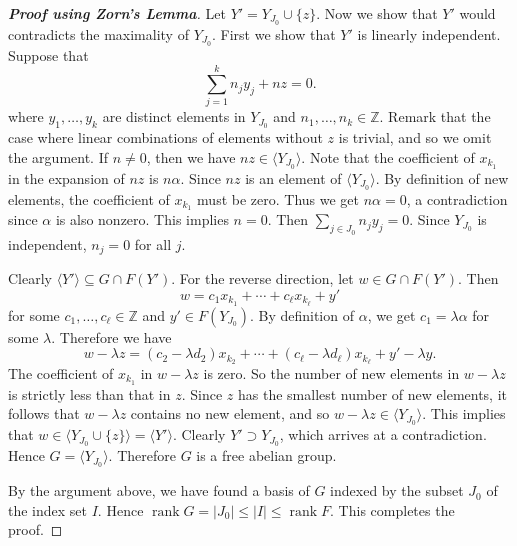 \begin{proof}[\textbf{Proof using Zorn's Lemma}]
	Let $Y' = Y_{J_0} \cup \{z\}$. Now we show that $Y'$ would contradicts the maximality of $Y_{J_0}$.  First we show that $Y'$ is linearly independent. Suppose that
	\begin{equation*}
		\sum_{j=1}^k n_j y_j + nz = 0.
	\end{equation*}
	where $y_1,\dots, y_k$ are distinct elements in $Y_{J_0}$ and $n_1,\dots, n_k\in \mathbb{Z}$. Remark that the case where linear combinations of elements without $z$ is trivial, and so we omit the argument. If $n\neq 0$, then we have $nz  \in \langle Y_{J_0} \rangle$. Note that the coefficient of $x_{k_1}$ in the expansion of $nz$ is $n\alpha$. Since $nz$ is an element of $\langle Y_{J_0} \rangle$. By definition of new elements, the coefficient of $x_{k_1}$ must be zero. Thus we get $n\alpha = 0$, a contradiction since $\alpha$ is also nonzero. This implies $n = 0$. Then $\sum_{j\in J_0} n_j y_j = 0$. Since $Y_{J_0}$ is independent, $n_j=0$ for all $j$.
	
	Clearly $\langle Y' \rangle \subseteq G \cap F(Y')$. For the reverse direction, let  $w\in G\cap F(Y')$. Then $$w = c_1 x_{k_1} + \cdots +c_\ell x_{k_{\ell}} + y'$$
	for some $c_1,\dots, c_\ell\in\mathbb{Z}$ and $y'\in F(Y_{J_0})$. By definition of $\alpha$, we get $c_1 = \lambda \alpha$ for some $\lambda$. Therefore we have
	\begin{equation*}
		w-\lambda z = (c_2-\lambda d_2) x_{k_2} + \cdots + (c_\ell- \lambda d_\ell) x_{k_{\ell}} + y' -\lambda y.
	\end{equation*}
	The coefficient of $x_{k_1}$ in $w - \lambda z$ is zero. So the number of new elements in $w-\lambda z$ is strictly less than that in $z$. Since $z$ has the smallest number of new elements, it follows that $w-\lambda z$ contains no new element, and so $w-\lambda z\in \langle Y_{J_0} \rangle$. This implies that $w  \in \langle Y_{J_0}\cup \{z\} \rangle = \langle Y' \rangle$. Clearly $Y' \supset Y_{J_0}$, which arrives at a contradiction. Hence $G =  \langle Y_{J_0}\rangle$. Therefore $G$ is a free abelian group.
	
	By the argument above, we have found a basis of $G$ indexed by the subset $J_0$ of the index set $I$. Hence $\operatorname{rank} G = |J_0|\leq |I| \leq \operatorname{rank} F$. This completes the proof.
\end{proof}
